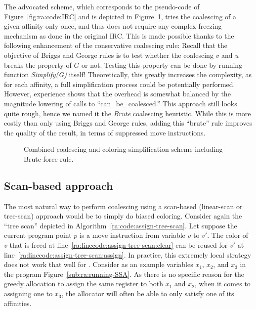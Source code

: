{\smallskip

The advocated scheme, which corresponds to the pseudo-code of Figure~\ref{fig:ra:code:IRC} and is depicted in Figure~\ref{fig:ra:brute}, tries the coalescing of a given affinity only once, and thus does not require any complex freezing mechanism as done in the original IRC.
This is made possible thanks to the following enhancement of the conservative coalescing rule:
Recall that the objective of Briggs and George rules is to test whether the coalescing $v$ and $u$ breaks the \gr{\regs} property of $G$ or not.
Testing this property can be done by running function \emph{Simplify(G)} itself!
Theoretically, this greatly increases the complexity, as for each affinity, a full simplification process could be potentially performed.
However, experience shows that the overhead is somewhat balanced by the magnitude lowering of calls to ``can\_be\_coalesced.''
This approach still looks quite rough, hence we named it the \emph{Brute} coalescing heuristic.
While this is more costly than only using Briggs and George rules, adding this ``brute'' rule improves the quality of the result, in terms of suppressed move instructions.


\begin{figure}
  \begin{center}
    \caption{Combined coalescing and coloring simplification scheme including Brute-force rule. \label{fig:ra:brute}}
  \end{center}
\end{figure}


\subsection{Scan-based approach}
The most natural way to perform coalescing using a scan-based (linear-scan or tree-scan) approach would be to simply do biased coloring.
Consider again the ``tree scan'' depicted in Algorithm~\ref{ra:code:assign-tree-scan}.
Let suppose the current program point $p$ is a move instruction from variable $v$ to $v'$.
The color of $v$ that is freed at line~\ref{ra:linecode:assign-tree-scan:clear} can be reused for $v'$ at line~\ref{ra:linecode:assign-tree-scan:assign}.
In practice, this extremely local strategy does not work that well for \phifuns.
Consider as an example variables $x_1$, $x_2$, and $x_3$ in the program Figure~\ref{sub:ra:running-SSA}.
As there is no specific reason for the greedy allocation to assign the same register to both $x_1$ and $x_2$, when it comes to assigning one to $x_3$, the allocator will often be able to only satisfy one of its affinities.

}

